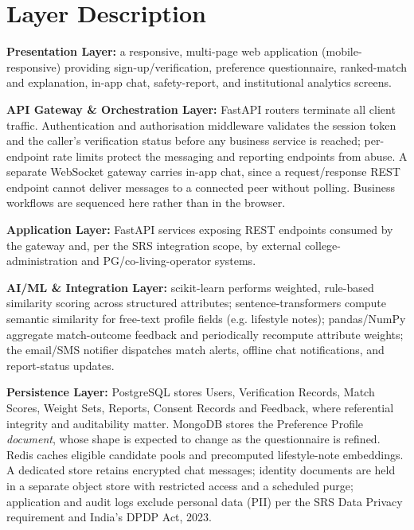 \documentclass[12pt,a4paper]{report}
\begin{document}
\section{Layer Description}

\textbf{Presentation Layer:} a responsive, multi-page web application (mobile-responsive) providing sign-up/verification, preference questionnaire, ranked-match and explanation, in-app chat, safety-report, and institutional analytics screens.

\vspace{2mm}
\textbf{API Gateway \& Orchestration Layer:} FastAPI routers terminate all client traffic. Authentication and authorisation middleware validates the session token and the caller's verification status before any business service is reached; per-endpoint rate limits protect the messaging and reporting endpoints from abuse. A separate WebSocket gateway carries in-app chat, since a request/response REST endpoint cannot deliver messages to a connected peer without polling. Business workflows are sequenced here rather than in the browser.

\vspace{2mm}
\textbf{Application Layer:} FastAPI services exposing REST endpoints consumed by the gateway and, per the SRS integration scope, by external college-administration and PG/co-living-operator systems.

\vspace{2mm}
\textbf{AI/ML \& Integration Layer:} scikit-learn performs weighted, rule-based similarity scoring across structured attributes; sentence-transformers compute semantic similarity for free-text profile fields (e.g. lifestyle notes); pandas/NumPy aggregate match-outcome feedback and periodically recompute attribute weights; the email/SMS notifier dispatches match alerts, offline chat notifications, and report-status updates.

\vspace{2mm}
\textbf{Persistence Layer:} PostgreSQL stores Users, Verification Records, Match Scores, Weight Sets, Reports, Consent Records and Feedback, where referential integrity and auditability matter. MongoDB stores the Preference Profile \emph{document}, whose shape is expected to change as the questionnaire is refined. Redis caches eligible candidate pools and precomputed lifestyle-note embeddings. A dedicated store retains encrypted chat messages; identity documents are held in a separate object store with restricted access and a scheduled purge; application and audit logs exclude personal data (PII) per the SRS Data Privacy requirement and India's DPDP Act, 2023.
\end{document}
